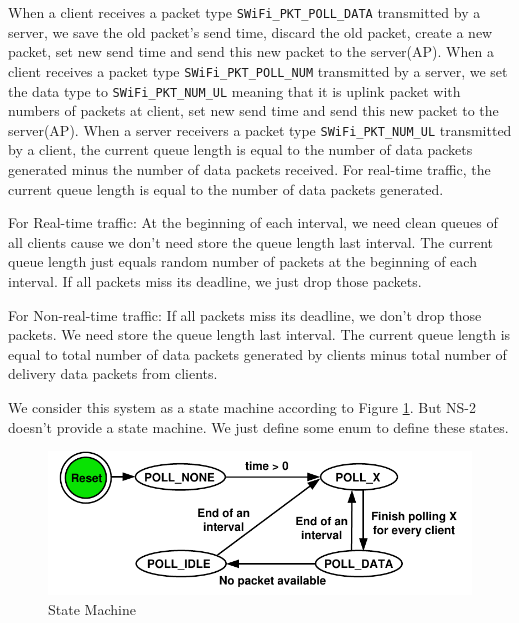 \documentclass{article}
\begin{document}
When a client receives a packet type \lstinline |SWiFi_PKT_POLL_DATA| transmitted by a server, we save the old packet's send time, discard the old packet, create a new packet, set new send time and send this new packet to the server(AP). 
When a client receives a packet type \lstinline |SWiFi_PKT_POLL_NUM| transmitted by a server, we set the data type to \lstinline |SWiFi_PKT_NUM_UL| meaning that it is uplink packet with numbers of packets at client, set new send time and send this new packet to the server(AP).
When a server receivers  a packet type \lstinline |SWiFi_PKT_NUM_UL| transmitted by a client, the current queue length is equal to the number of data packets generated minus the number of data packets received. For real-time traffic, the current queue length is equal to the number of data packets generated.  

For Real-time traffic: At the beginning of each interval, we need clean queues of all clients cause we don't need store the queue length last interval. The current queue length just equals random number of packets at the beginning of each interval. If all packets miss its deadline, we just drop those packets.

For Non-real-time traffic:  If all packets miss its deadline, we don't drop those packets. We need store the queue length last interval. The current queue length is equal to total number of data packets generated by clients minus total number of delivery data packets from clients. 

We consider this system as a state machine according to Figure \ref{state machine}. But NS-2 doesn't provide a state machine. We just define some enum to define these states. 

\begin{figure}[htbp]
\centering
\includegraphics[scale=0.8]{state_machine.pdf}
\caption{State Machine}
\label{state machine}
\end{figure}
\end{document}
